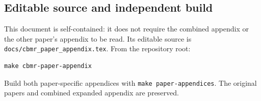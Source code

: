 \documentclass[11pt,a4paper]{article}
\numberwithin{equation}{section}
\begin{document}
\subsection{Editable source and independent build}
This document is self-contained: it does not require the combined
appendix or the other paper's appendix to be read.
Its editable source is \texttt{docs/cbmr\_paper\_appendix.tex}.
From the repository root:
\begin{verbatim}
make cbmr-paper-appendix
\end{verbatim}
Build both paper-specific appendices with \texttt{make paper-appendices}.
The original papers and combined expanded appendix are preserved.
\end{document}
